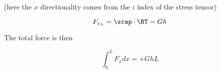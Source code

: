 (here the $x$ directionality comes from the $i$ index of the stress tensor)

\begin{equation}\label{eqn:continuumL11:790}
F_{x_L} = \xcap \cdot \BT = G h
\end{equation}

The total force is then

\begin{equation}\label{eqn:continuumL11:810}
\int_0^L F_x dx = + G h L
\end{equation}

\EndArticle
